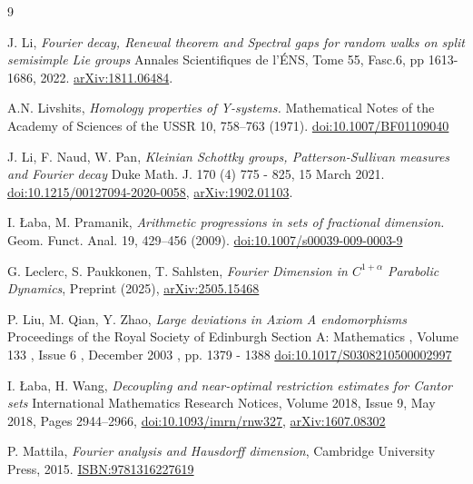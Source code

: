 \documentclass[a4paper]{article}
\theoremstyle{definition}
\begin{document}
\begin{thebibliography}{9}
     

    {J. Li},
    \emph{Fourier decay, Renewal theorem and Spectral gaps for random walks on split semisimple Lie groups}
    Annales Scientifiques de l'ÉNS, Tome 55, Fasc.6, pp 1613-1686, 2022. \href{https://arxiv.org/abs/1811.06484v2}{	arXiv:1811.06484}.


    {A.N. Livshits},
    \emph{Homology properties of Y-systems.}
    Mathematical Notes of the Academy of Sciences of the USSR 10, 758–763 (1971). \href{https://doi.org/10.1007/BF01109040}{doi:10.1007/BF01109040}
    
    {J. Li, F. Naud, W. Pan},
    \emph{Kleinian Schottky groups, Patterson-Sullivan measures and Fourier decay} 
    Duke Math. J. 170 (4) 775 - 825, 15 March 2021. \\ \href{https://doi.org/10.1215/00127094-2020-0058}{doi:10.1215/00127094-2020-0058}, \href{https://arxiv.org/abs/1902.01103}{	arXiv:1902.01103}.  



    {I. Łaba, M. Pramanik},
    \emph{Arithmetic progressions in sets of fractional dimension.}
    Geom. Funct. Anal. 19, 429–456 (2009). \href{https://doi.org/10.1007/s00039-009-0003-9}{doi:10.1007/s00039-009-0003-9}


    {G. Leclerc, S. Paukkonen, T. Sahlsten},
    \emph{Fourier Dimension in $C^{1+\alpha}$ Parabolic Dynamics},
    Preprint (2025), \href{https://arxiv.org/abs/2505.15468}{arXiv:2505.15468}


    {P. Liu, M. Qian, Y. Zhao},
    \emph{Large deviations in Axiom A endomorphisms}
    Proceedings of the Royal Society of Edinburgh Section A: Mathematics , Volume 133 , Issue 6 , December 2003 , pp. 1379 - 1388
    \href{https://doi.org/10.1017/S0308210500002997}{doi:10.1017/S0308210500002997}



    {I. Łaba, H. Wang},
    \emph{Decoupling and near-optimal restriction estimates for Cantor sets}
    International Mathematics Research Notices, Volume 2018, Issue 9, May 2018, Pages 2944–2966, \href{https://doi.org/10.1093/imrn/rnw327}{doi:10.1093/imrn/rnw327},  \href{https://arxiv.org/abs/1607.08302}{arXiv:1607.08302}
  

     {P. Mattila},
     \emph{Fourier analysis and Hausdorff dimension},
     Cambridge University Press, 2015. \href{https://www.cambridge.org/core/books/fourier-analysis-and-hausdorff-dimension/78A25BED2C6E4F9B911971305DC928B0}{ISBN:9781316227619}


\end{thebibliography}
\end{document}
